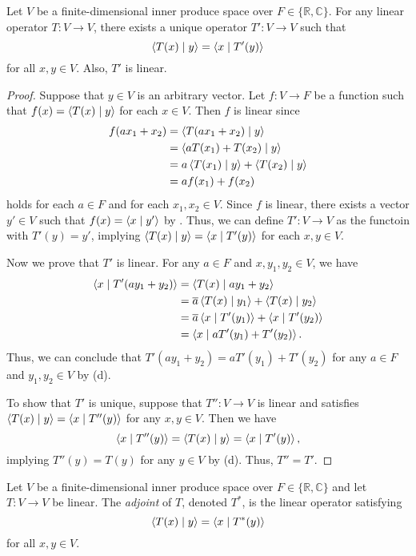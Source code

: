 \begin{theorem}
  Let $V$ be a finite-dimensional inner produce space over
  $F \in \{\mathbb{R}, \mathbb{C}\}$.
  For any linear operator $T: V \to V$, there exists a unique operator
  $T': V \to V$ such that
  \begin{equation*}
    \left\langle T(x) \; \middle| \; y \right\rangle = \left\langle x \; \middle| \; T'(y) \right\rangle
  \end{equation*}
  for all $x, y \in V$.
  Also, $T'$ is linear.
\end{theorem}
\begin{proof}
  Suppose that $y \in V$ is an arbitrary vector.
  Let $f: V \to F$ be a function such that $f(x) = \left\langle T(x) \; \middle| \; y \right\rangle$ for each
  $x \in V$.
  Then $f$ is linear since
  \begin{align*}
    f(ax_1 + x_2)
    &= \left\langle T(ax_1 + x_2) \; \middle| \; y \right\rangle \\
    &= \left\langle aT(x_1) + T(x_2) \; \middle| \; y \right\rangle \\
    &= a\left\langle T(x_1) \; \middle| \; y \right\rangle + \left\langle T(x_2) \; \middle| \; y \right\rangle \\
    &= af(x_1) + f(x_2)
  \end{align*}
  holds for each $a \in F$ and for each $x_1, x_2 \in V$.
  Since $f$ is linear, there exists a vector $y' \in V$ such that
  $f(x) = \left\langle x \; \middle| \; y' \right\rangle$ by .
  Thus, we can define $T': V \to V$ as the functoin with $T'(y) = y'$,
  implying $\left\langle T(x) \; \middle| \; y \right\rangle = \left\langle x \; \middle| \; T'(y) \right\rangle$ for each $x, y \in V$.

  Now we prove that $T'$ is linear.
  For any $a \in F$ and $x, y_1, y_2 \in V$, we have
  \begin{align*}
    \left\langle x \; \middle| \; T'(ay_1 + y_2) \right\rangle
    &= \left\langle T(x) \; \middle| \; ay_1 + y_2 \right\rangle \\
    &= \overline{a}\left\langle T(x) \; \middle| \; y_1 \right\rangle + \left\langle T(x) \; \middle| \; y_2 \right\rangle \\
    &= \overline{a}\left\langle x \; \middle| \; T'(y_1) \right\rangle + \left\langle x \; \middle| \; T'(y_2) \right\rangle \\
    &= \left\langle x \; \middle| \; aT'(y_1) + T'(y_2) \right\rangle.
  \end{align*}
  Thus, we can conclude that $T'(ay_1 + y_2) = aT'(y_1) + T'(y_2)$ for any
  $a \in F$ and $y_1, y_2 \in V$ by  (d).

  To show that $T'$ is unique, suppose that $T'': V \to V$ is linear and
  satisfies $\left\langle T(x) \; \middle| \; y \right\rangle = \left\langle x \; \middle| \; T''(y) \right\rangle$ for any $x, y \in V$.
  Then we have
  \begin{equation*}
    \left\langle x \; \middle| \; T''(y) \right\rangle = \left\langle T(x) \; \middle| \; y \right\rangle = \left\langle x \; \middle| \; T'(y) \right\rangle,
  \end{equation*}
  implying $T''(y) = T(y)$ for any $y \in V$ by 
  (d).
  Thus, $T'' = T'$.
\end{proof}

\begin{definition}
  Let $V$ be a finite-dimensional inner produce space over
  $F \in \{\mathbb{R}, \mathbb{C}\}$ and let $T: V \to V$ be linear.
  The \emph{adjoint} of $T$, denoted $T^*$, is the linear operator satisfying
  \begin{equation*}
    \left\langle T(x) \; \middle| \; y \right\rangle = \left\langle x \; \middle| \; T^*(y) \right\rangle
  \end{equation*}
  for all $x, y \in V$.
\end{definition}